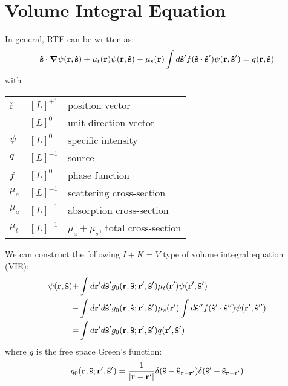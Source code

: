 \documentclass[main]{subfiles}
\begin{document}
\section{Volume Integral Equation}
\label{sec:2d volume integral equation}

In general, RTE can be written as:
\begin{equation} \label{rte}
	\mathbf{\hat{s}}\cdot\mbox{\boldmath$ \nabla $} \psi(\mathbf{r},\mathbf{\hat{s}})
	+\mu_t(\mathbf{r})\psi(\mathbf{r},\mathbf{\hat{s}})
	-\mu_s(\mathbf{r})\int d\mathbf{\hat{s}}^\prime
	f(\mathbf{\hat{s}}\cdot\mathbf{\hat{s}}^{\prime})\psi(\mathbf{r},\mathbf{\hat{s}}^{\prime})
	=q(\mathbf{r},\mathbf{\hat{s}})
\end{equation}
with
\begin{center} \begin{tabular}{lll}
	\v{r}	&	$[L]^{+1}$	& position vector		\\
	\uv{s}	&	$[L]^{0}$	& unit direction vector		\\
	$\psi$	&	$[L]^{0}$	& specific intensity		\\
	$q$	&	$[L]^{-1}$	& source			\\
	$f$	&	$[L]^{0}$	& phase function		\\
	$\mu_s$	&	$[L]^{-1}$	& scattering cross-section	\\
	$\mu_a$	&	$[L]^{-1}$	& absorption cross-section	\\
	$\mu_t$	&	$[L]^{-1}$	& $\mu_a+\mu_s$, total cross-section	\\
\end{tabular} \end{center}

We can construct the following $I+K=V$ type of volume integral equation (VIE):
\begin{equation} \label{vie}
	\begin{split}
		\psi(\mathbf{r},\mathbf{\hat{s}}) +& \int d\mathbf{r}^{\prime} d\mathbf{\hat{s}}^{\prime}
		g_0(\mathbf{r},\mathbf{\hat{s}};\mathbf{r}^{\prime},\mathbf{\hat{s}}^{\prime})
		\mu_t(\mathbf{r}^{\prime})\psi(\mathbf{r}^{\prime},\mathbf{\hat{s}}^{\prime})
		\\
		-& \int d\mathbf{r}^{\prime} d\mathbf{\hat{s}}^{\prime} g_0(\mathbf{r},\mathbf{\hat{s}};\mathbf{r}^{\prime},\mathbf{\hat{s}}^{\prime})
		\mu_s(\mathbf{r}^{\prime}) \int d\mathbf{\hat{s}}^{{\prime\prime}}
		f(\mathbf{\hat{s}}^{\prime}\cdot\mathbf{\hat{s}}^{{\prime\prime}})\psi(\mathbf{r}^{\prime},\mathbf{\hat{s}}^{{\prime\prime}})
		\\
		=& \int d\mathbf{r}^{\prime} d\mathbf{\hat{s}}^{\prime}
		g_0(\mathbf{r},\mathbf{\hat{s}};\mathbf{r}^{\prime},\mathbf{\hat{s}}^{\prime})q(\mathbf{r}^{\prime},\mathbf{\hat{s}}^{\prime})
	\end{split}
\end{equation}
where $g$ is the free space Green's function:
\begin{equation} \label{g0}
	g_0(\mathbf{r},\mathbf{\hat{s}};\mathbf{r}^{\prime},\mathbf{\hat{s}}^{\prime}) = \frac{1}{\left| \mathbf{r}-\mathbf{r}^{\prime} \right|} 
	\delta(\mathbf{\hat{s}}-\mathbf{\hat{s}}_{\mathbf{r}-\mathbf{r}^{\prime}})
	\delta(\mathbf{\hat{s}}^{\prime}-\mathbf{\hat{s}}_{\mathbf{r}-\mathbf{r}^{\prime}})
\end{equation}
\end{document}
